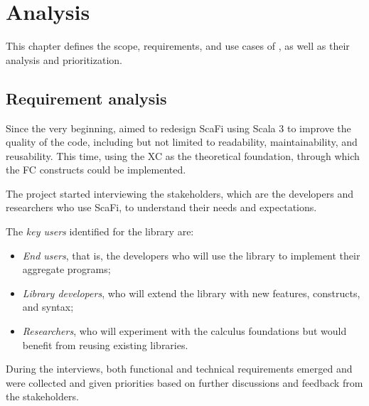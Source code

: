 \chapter{Analysis}
\label{chap:analysis}
This chapter defines the scope, requirements, and use cases of \this, as well as their analysis and prioritization.

\section{Requirement analysis}

Since the very beginning, \this aimed to redesign ScaFi using Scala 3 to improve the quality of the code, including but not limited to readability, maintainability, and reusability.
%
This time, using the \ac{XC} as the theoretical foundation, through which the \ac{FC} constructs could be implemented.

The project started interviewing the stakeholders, which are the developers and researchers who use ScaFi, to understand their needs and expectations.

The \textit{key users} identified for the library are:
\begin{itemize}
    \item \textit{End users}, that is, the developers who will use the library to implement their aggregate programs;
    \item \textit{Library developers}, who will extend the library with new features, constructs, and syntax;
    \item \textit{Researchers}, who will experiment with the calculus foundations but would benefit from reusing existing libraries.
\end{itemize}

During the interviews, both functional and technical requirements emerged and were collected and given priorities based on further discussions and feedback from the stakeholders.

